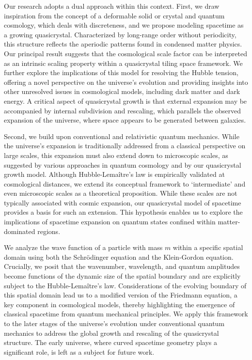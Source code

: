 \documentclass[sn-mathphys-num]{sn-jnl}%
\begin{document}
Our research adopts a dual approach within this context. First, we draw inspiration from the concept of a deformable solid or crystal and quantum cosmology, which deals with discreteness, and we propose modeling spacetime as a growing quasicrystal. Characterized by long-range order without periodicity, this structure reflects the aperiodic patterns found in condensed matter physics. Our principal result suggests that the cosmological scale factor can be interpreted as an intrinsic scaling property within a quasicrystal tiling space framework. We further explore the implications of this model for resolving the Hubble tension, offering a novel perspective on the universe's evolution and providing insights into other unresolved issues in cosmological models, including dark matter and dark energy. A critical aspect of quasicrystal growth is that external expansion may be accompanied by internal subdivision and rescaling, which parallels the observed expansion of the universe, where space appears to be generated between galaxies.

Second, we build upon conventional and relativistic quantum mechanics. While the universe's expansion is traditionally addressed from a classical perspective on large scales, this expansion must also extend down to microscopic scales, as suggested by various approaches in quantum cosmology \cite{bojowald,Kuzmichev} and by our quasicrystal growth model. Although Hubble-Lemaître's law is empirically validated at cosmological distances, we extend its conceptual framework to `intermediate' and even microscopic scales as a theoretical proposition. While these scales are not typically associated with cosmic expansion, our quasicrystal model of spacetime provides a basis for such an extension. This hypothesis enables us to explore the implications of spacetime expansion on quantum states confined within matter-dominated regions.

We analyze the wave function of a particle with mass $m$ within a specific spatial domain using both the Schr{\"o}dinger equation and the Klein-Gordon equation. Crucially, we posit that the wavenumber, wavelength, and quantum amplitudes become functions of the dynamic size of the spatial boundary and are explicitly subject to the Hubble-Lemaître's law. Considerations of the evolving boundary of this spatial domain lead us to a modified version of the Friedmann equation, a key component in cosmological models, thereby highlighting the emergence of classical spacetime from quantum mechanical principles. We apply this framework to the later stages of the universe's evolution under conventional quantum mechanics to address the global growth and rescaling of the quasicrystal structure. The early universe, where curved spacetime geometry plays a significant role, is left as a subject for future work.
\end{document}
